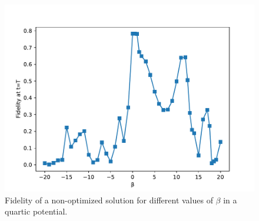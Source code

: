 \documentclass[a4paper, twocolumn]{revtex4-1}
\begin{document}
\begin{figure}[h]
	\includegraphics[width=\columnwidth]{graphics/exploration/nonOptBeta.pdf}
	\caption{Fidelity of a non-optimized solution for different values of $\beta$ in a quartic potential.}
	\label{fig:beta}
\end{figure}
\end{document}
